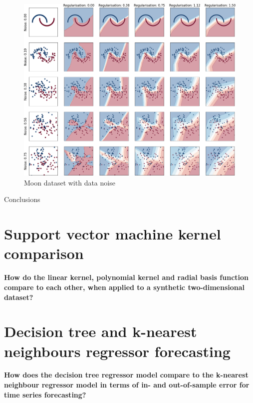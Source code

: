 \documentclass[9.5pt]{beamer}
\begin{document}
    \begin{frame}{}
        \begin{figure}
            \centering
            \includegraphics[height=0.9\textheight]{images/boundaries}
            \caption{Moon dataset with data noise}
        \end{figure}
    \end{frame}

    \begin{frame}{Conclusions}
    \end{frame}


    \section{Support vector machine kernel comparison}

    \begin{frame}
        \textbf{How do the linear kernel, polynomial kernel and radial basis function compare to each other, when applied to a synthetic two-dimensional dataset?}
    \end{frame}


    \section{Decision tree and k-nearest neighbours regressor forecasting}
    \begin{frame}
        \textbf{How does the decision tree regressor model compare to the k-nearest neighbour regressor model in terms of in- and out-of-sample error for time series forecasting?}
    \end{frame}
\end{document}
